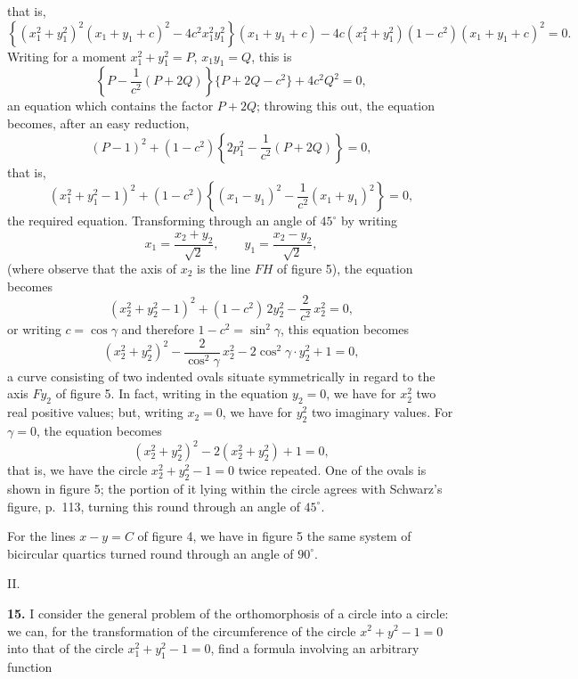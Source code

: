 \documentclass[11pt,a4paper]{article}
\begin{document}
that is,
\[
\left\{(x_1^2 + y_1^2)^2(x_1 + y_1 + c)^2 - 4 c^2 x_1^2 y_1^2\right\}(x_1 + y_1 + c) - 4 c(x_1^2 + y_1^2)(1 - c^2)(x_1 + y_1 + c)^2 = 0.
\]
Writing for a moment $x_1^2 + y_1^2 = P$, $x_1 y_1 = Q$, this is
\[
\left\{P - \frac{1}{c^2}(P + 2Q)\right\}\{P + 2Q - c^2\} + 4 c^2 Q^2 = 0,
\]
an equation which contains the factor $P + 2Q$; throwing this out, the equation becomes, after an easy reduction,
\[
(P - 1)^2 + (1 - c^2)\left\{2 p_1^2 - \frac{1}{c^2}(P + 2 Q)\right\} = 0,
\]
that is,
\[
(x_1^2 + y_1^2 - 1)^2 + (1 - c^2)\left\{(x_1 - y_1)^2 - \frac{1}{c^2}(x_1 + y_1)^2\right\} = 0,
\]
the required equation. Transforming through an angle of $45^\circ$ by writing
\[
x_1 = \frac{x_2 + y_2}{\sqrt{2}}, \qquad y_1 = \frac{x_2 - y_2}{\sqrt{2}},
\]
(where observe that the axis of $x_2$ is the line $FH$ of figure 5), the equation becomes
\[
(x_2^2 + y_2^2 - 1)^2 + (1 - c^2)\,2 y_2^2 - \frac{2}{c^2}\,x_2^2 = 0,
\]
or writing $c = \cos\gamma$ and therefore $1 - c^2 = \sin^2\gamma$, this equation becomes
\[
(x_2^2 + y_2^2)^2 - \frac{2}{\cos^2\gamma}\,x_2^2 - 2\cos^2\gamma\cdot y_2^2 + 1 = 0,
\]
a curve consisting of two indented ovals situate symmetrically in regard to the axis $F y_2$ of figure 5. In fact, writing in the equation $y_2 = 0$, we have for $x_2^2$ two real positive values; but, writing $x_2 = 0$, we have for $y_2^2$ two imaginary values. For $\gamma = 0$, the equation becomes
\[
(x_2^2 + y_2^2)^2 - 2(x_2^2 + y_2^2) + 1 = 0,
\]
that is, we have the circle $x_2^2 + y_2^2 - 1 = 0$ twice repeated. One of the ovals is shown in figure 5; the portion of it lying within the circle agrees with Schwarz's figure, p.~113, turning this round through an angle of $45^\circ$.

For the lines $x - y = C$ of figure 4, we have in figure 5 the same system of bicircular quartics turned round through an angle of $90^\circ$.

\begin{center}\textsc{II.}\end{center}

\textbf{15.} I consider the general problem of the orthomorphosis of a circle into a circle: we can, for the transformation of the circumference of the circle $x^2 + y^2 - 1 = 0$ into that of the circle $x_1^2 + y_1^2 - 1 = 0$, find a formula involving an arbitrary function
\end{document}
